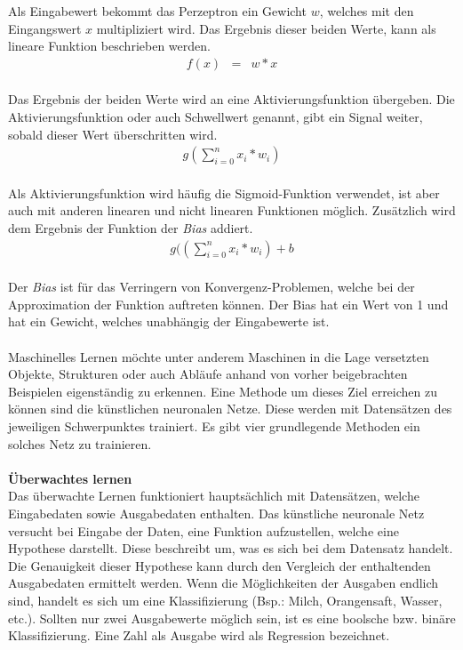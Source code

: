 \documentclass[a4paper,12pt,oneside]{article}
\begin{document}
Als Eingabewert bekommt das Perzeptron ein Gewicht $w$, welches mit den Eingangswert $x$ multipliziert wird. Das Ergebnis dieser beiden Werte, kann als lineare Funktion beschrieben werden.\\
\begin{eqnarray} f(x) & = & w*x \end{eqnarray}\\
Das Ergebnis der beiden Werte wird an eine Aktivierungsfunktion übergeben. Die Aktivierungsfunktion oder auch Schwellwert genannt, gibt ein Signal weiter, sobald dieser Wert überschritten wird.\\
\begin{eqnarray} g( \sum_{i=0}^n x_{i} *w_{i}) \end{eqnarray}\\
Als Aktivierungsfunktion wird häufig die Sigmoid-Funktion verwendet, ist aber auch mit anderen linearen und nicht linearen Funktionen möglich. Zusätzlich wird dem Ergebnis der Funktion der \textit{Bias} addiert.\\
\begin{eqnarray} g(( \sum_{i=0}^n x_{i} *w_{i}) +b \end{eqnarray}\\
Der \textit{Bias} ist für das Verringern von Konvergenz-Problemen, welche bei der Approximation der Funktion auftreten können. Der Bias hat ein Wert von 1 und hat ein Gewicht, welches unabhängig der Eingabewerte ist.\\\\
Maschinelles Lernen möchte unter anderem Maschinen in die Lage versetzten Objekte, Strukturen oder auch Abläufe anhand von vorher beigebrachten Beispielen eigenständig zu erkennen. Eine Methode um dieses Ziel erreichen zu können sind die künstlichen neuronalen Netze. Diese werden mit Datensätzen des jeweiligen Schwerpunktes trainiert. Es gibt vier grundlegende Methoden ein solches Netz zu trainieren.\\\\
\textbf{Überwachtes lernen}\\
Das überwachte Lernen funktioniert hauptsächlich mit Datensätzen, welche Eingabedaten sowie Ausgabedaten enthalten. Das künstliche neuronale Netz versucht bei Eingabe der Daten, eine Funktion aufzustellen, welche eine Hypothese darstellt. Diese beschreibt um, was es sich bei dem Datensatz handelt. Die Genauigkeit dieser Hypothese kann durch den Vergleich der enthaltenden Ausgabedaten ermittelt werden. Wenn die Möglichkeiten der Ausgaben endlich sind, handelt es sich um eine Klassifizierung (Bsp.: Milch, Orangensaft, Wasser, etc.). Sollten nur zwei Ausgabewerte möglich sein, ist es eine boolsche bzw. binäre Klassifizierung. Eine Zahl als Ausgabe wird als Regression bezeichnet.\\\\
\end{document}
